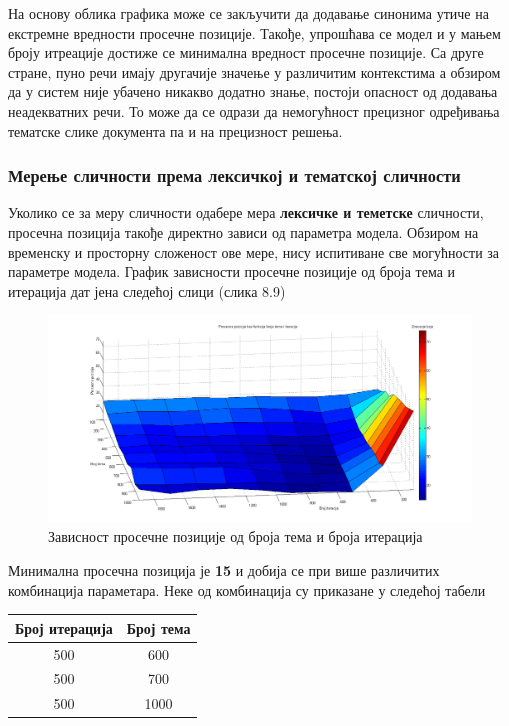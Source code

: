 На основу облика графика може се закључити да додавање синонима утиче на екстремне вредности просечне позиције. Такође, упрошћава се модел и у мањем броју итреације достиже се минимална вредност просечне позиције. 
Са друге стране, пуно речи имају другачије значење у различитим контекстима а обзиром да у систем није убачено никакво додатно знање, постоји опасност од додавања неадекватних речи. То може да се одрази да немогућност прецизног одређивања тематске слике документа па и на прецизност решења.




\subsubsection{Мерење сличности према лексичкој и тематској сличности}
	
Уколико се за меру сличности одабере мера  \textbf{лексичке и теметске} сличности, просечна позиција такође директно зависи од параметра модела. Обзиром на временску и просторну сложеност ове мере, нису испитиване све могућности за параметре модела. График зависности просечне позиције од броја тема и итерација дат јена следећој слици (слика 8.9)

		\begin{figure}[H]
    \centering
   \includegraphics[scale=0.3]{./Slike/distNoStemSyn.png} 
	\caption{Зависност просечне позиције од броја тема и броја итерација}
	\label{fig:slika1}
\end{figure}

Минимална просечна позиција је \textbf{15} и добија се при више различитих комбинација параметара. Неке од комбинација су приказане у следећој табели

\begin{center}
\begin{tabular}{|c|c|}
\hline
Број итерација & Број тема \\
\hline\hline
500 & 600 \\
500 & 700 \\
500 & 1000 \\
\hline
\end{tabular}

\end{center}





